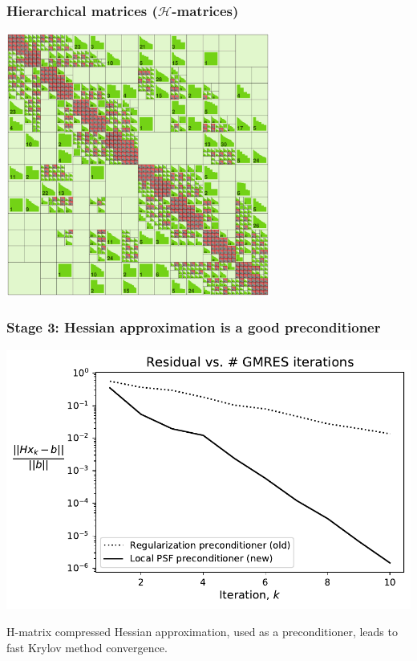 \documentclass[10pt,final,xcolor=dvipsnames]{beamer}
\begin{document}
\begin{frame}
	\frametitle{Hierarchical matrices ($\mathcal{H}$-matrices)}
	\begin{center}
		\includegraphics[width=0.65\textwidth]{heat_inverse_problem_Hfull_hmatrix.eps}
	\end{center}
\end{frame}
\begin{frame}
	\frametitle{Stage 3: Hessian approximation is a good preconditioner}
	\begin{center}
		\includegraphics[width=0.75\columnwidth]{ice_gmres_convergence.pdf}
	\end{center}
\begin{center}
	H-matrix compressed Hessian approximation, used as a preconditioner, leads to fast Krylov method convergence.
\end{center}
\end{frame}
\end{document}
